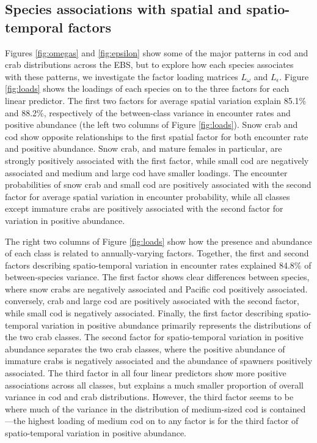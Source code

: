 \documentclass[11pt,]{article}
\begin{document}
\hypertarget{species-associations-with-spatial-and-spatio-temporal-factors}{%
\subsection{Species associations with spatial and spatio-temporal factors}\label{species-associations-with-spatial-and-spatio-temporal-factors}}

Figures \ref{fig:omegas} and \ref{fig:epsilon} show some of the major patterns in cod and crab distributions across the EBS, but to explore how each species associates with these patterns, we investigate the factor loading matrices \(L_\omega\) and \(L_\epsilon\). Figure \ref{fig:loads} shows the loadings of each species on to the three factors for each linear predictor. The first two factors for average spatial variation explain 85.1\% and 88.2\%, respectively of the between-class variance in encounter rates and positive abundance (the left two columns of Figure \ref{fig:loads}). Snow crab and cod show opposite relationships to the first spatial factor for both encounter rate and positive abundance. Snow crab, and mature females in particular, are strongly positively associated with the first factor, while small cod are negatively associated and medium and large cod have smaller loadings. The encounter probabilities of snow crab and small cod are positively associated with the second factor for average spatial variation in encounter probability, while all classes except immature crabs are positively associated with the second factor for variation in positive abundance.

The right two columns of Figure \ref{fig:loads} show how the presence and abundance of each class is related to annually-varying factors. Together, the first and second factors describing spatio-temporal variation in encounter rates explained 84.8\% of between-species variance. The first factor shows clear differences between species, where snow crabs are negatively associated and Pacific cod positively associated. conversely, crab and large cod are positively associated with the second factor, while small cod is negatively associated. Finally, the first factor describing spatio-temporal variation in positive abundance primarily represents the distributions of the two crab classes. The second factor for spatio-temporal variation in positive abundance separates the two crab classes, where the positive abundance of immature crabs is negatively associated and the abundance of spawners positively associated. The third factor in all four linear predictors show more positive associations across all classes, but explains a much smaller proportion of overall variance in cod and crab distributions. However, the third factor seems to be where much of the variance in the distribution of medium-sized cod is contained---the highest loading of medium cod on to any factor is for the third factor of spatio-temporal variation in positive abundance.
\end{document}
